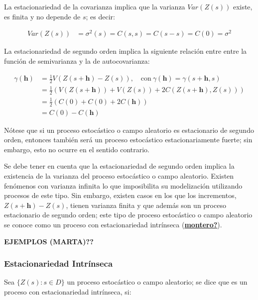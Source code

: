 \documentclass[
]{book}
\begin{document}
La estacionariedad de la covarianza implica que la varianza \(Var(Z(s))\) existe, es finita y no depende de \(s\); es decir:

\begin{align}
        Var(Z(s))&=\sigma^2(s)=C(s,s)=C(s-s)=C(0)=\sigma^2  
\end{align}

La estacionariedad de segundo orden implica la siguiente relación entre entre la función de semivarianza y la de autocovarianza:

\begin{align}
    \gamma(\textbf{h})&=\frac{1}{2}V(Z(s+\textbf{h})-Z(s)), \quad \text{con} \ \gamma(\textbf{h})=\gamma(s+\textbf{h},s)\\
&=\frac{1}{2}(V(Z(s+\textbf{h}))+V(Z(s))+2C(Z(s+\textbf{h}),Z(s)))\\
&=\frac{1}{2}(C(0)+C(0)+2C(\textbf{h}))\\
&=C(0)-C(\textbf{h})
\end{align}

Nótese que si un proceso estocástico o campo aleatorio es estacionario de segundo orden, entonces también será un proceso estocástico estacionariamente fuerte; sin embargo, esto no ocurre en el sentido contrario.

Se debe tener en cuenta que la estacionariedad de segundo orden implica la existencia de la varianza del proceso estocástico o campo aleatorio. Existen fenómenos con varianza infinita lo que imposibilita su modelización utilizando procesos de este tipo. Sin embargo, existen casos en los que los incrementos, \(Z(s+\textbf{h})-Z(s)\), tienen varianza finita y que además son un proceso estacionario de segundo orden; este tipo de proceso estocástico o campo aleatorio se conoce como un proceso con estacionariedad intrínseca (\protect\hyperlink{ref-montero}{\textbf{montero?}}).

\textbf{EJEMPLOS (MARTA)??}

\hypertarget{estacionariedad-intruxednseca}{%
\subsubsection*{Estacionariedad Intrínseca}\label{estacionariedad-intruxednseca}}

Sea \(\{Z(s): s\in D\}\) un proceso estocástico o campo aleatorio; se dice que es un proceso con estacionariedad intrínseca, si:
\end{document}
